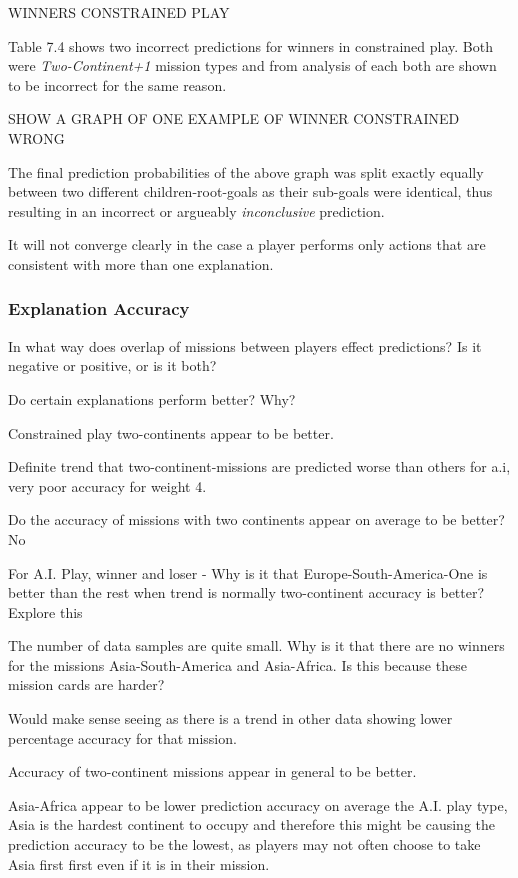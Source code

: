 \documentclass[parskip]{cs4rep}
\begin{document}
WINNERS CONSTRAINED PLAY

Table 7.4 shows two incorrect predictions for winners in constrained play. Both were \textit{Two-Continent+1} mission types and from analysis of each both are shown to be incorrect for the same reason. 

SHOW A GRAPH OF ONE EXAMPLE OF WINNER CONSTRAINED WRONG

The final prediction probabilities of the above graph was split exactly equally between two different children-root-goals as their sub-goals were identical, thus resulting in an incorrect or argueably \textit{inconclusive} prediction.

It will not converge clearly in the case a player performs only actions that are consistent with more than one explanation.

\subsubsection{Explanation Accuracy}

In what way does overlap of missions between players effect predictions? Is it negative or positive, or is it both?

Do certain explanations perform better? Why?

Constrained play two-continents appear to be better.

Definite trend that two-continent-missions are predicted worse than others for a.i, very poor accuracy for weight 4.
 
Do the accuracy of missions with two continents appear on average to be better? No

For A.I. Play, winner and loser - Why is it that Europe-South-America-One is better than the rest when trend is normally two-continent accuracy is better? Explore this

The number of data samples are quite small.	Why is it that there are no winners for the missions Asia-South-America and Asia-Africa. Is this because these mission cards are harder?

Would make sense seeing as there is a trend in other data showing lower percentage accuracy for that mission.

Accuracy of two-continent missions appear in general to be better.

Asia-Africa appear to be lower prediction accuracy on average the A.I. play type, Asia is the hardest continent to occupy and therefore this might be causing the prediction accuracy to be the lowest, as players may not often choose to take Asia first first even if it is in their mission.
\end{document}
